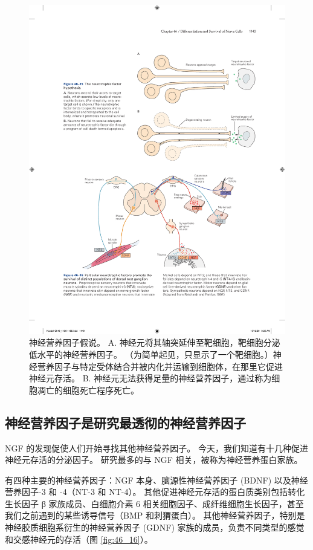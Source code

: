 \begin{figure}[htbp]
	\centering
	\includegraphics[width=0.7\linewidth]{chap46/fig_46_15}
	\caption{神经营养因子假说。 A. 神经元将其轴突延伸至靶细胞，靶细胞分泌低水平的神经营养因子。 （为简单起见，只显示了一个靶细胞。）神经营养因子与特定受体结合并被内化并运输到细胞体，在那里它促进神经元存活。 B. 神经元无法获得足量的神经营养因子，通过称为细胞凋亡的细胞死亡程序死亡。}
	\label{fig:46_15}
\end{figure}

\subsection{神经营养因子是研究最透彻的神经营养因子}
NGF 的发现促使人们开始寻找其他神经营养因子。 今天，我们知道有十几种促进神经元存活的分泌因子。 研究最多的与 NGF 相关，被称为神经营养蛋白家族。

有四种主要的神经营养因子：NGF 本身、脑源性神经营养因子 (BDNF) 以及神经营养因子-3 和 -4（NT-3 和 NT-4）。 其他促进神经元存活的蛋白质类别包括转化生长因子 β 家族成员、白细胞介素 6 相关细胞因子、成纤维细胞生长因子，甚至我们之前遇到的某些诱导信号（BMP 和刺猬蛋白）。 
其他神经营养因子，特别是神经胶质细胞系衍生的神经营养因子 (GDNF) 家族的成员，负责不同类型的感觉和交感神经元的存活（图 \ref{fig:46_16}）。

